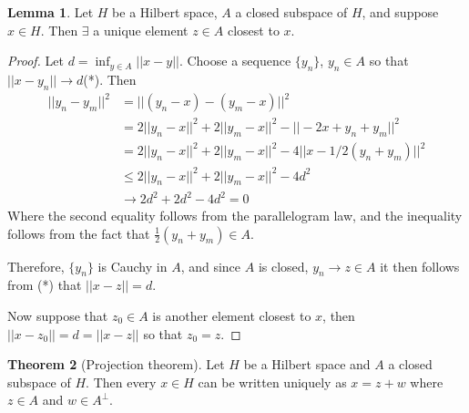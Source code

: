 \documentclass[11pt,a4paper]{article}
\theoremstyle{definition}
\newtheorem{thm}{Theorem}[section]
\newtheorem{lem}[thm]{Lemma}
\begin{document}
\begin{lem}
Let $H$ be a Hilbert space, $A$ a closed subspace of $H$, and suppose $x\in H$. Then $\exists$ a unique element $z\in A$ closest to $x$.

\end{lem}

\begin{proof}
Let $d=\inf_{y\in A}||x-y||$. Choose a sequence $\{y_n\}$, $y_n\in A$ so that $||x-y_n||\rightarrow d$\qquad (*). Then
\begin{align*}
||y_n-y_m||^2 &=||(y_n-x)-(y_m-x)||^2\\
              &=2||y_n-x||^2+2||y_m-x||^2-||-2x+y_n+y_m||^2\\
              &=2||y_n-x||^2+2||y_m-x||^2-4||x-1/2(y_n+y_m)||^2\\
              &\leq 2||y_n-x||^2+2||y_m-x||^2-4d^2\\
              &\rightarrow 2d^2+2d^2-4d^2=0
\end{align*}
Where the second equality follows from the parallelogram law, and the inequality follows from the fact that $\frac{1}{2}(y_n+y_m)\in A$.

Therefore, $\{y_n\}$ is Cauchy in $A$, and since $A$ is closed, $y_n\rightarrow z\in A$ it then follows from (*) that $||x-z||=d$.

Now suppose that $z_0\in A$ is another element closest to $x$, then\hspace{0.2cm} $||x-z_0||=d=||x-z||$ so that $z_0=z$.

\end{proof}


\begin{thm}[Projection theorem]
Let $H$ be a Hilbert space and $A$ a closed subspace of $H$. Then every $x\in H$ can be written uniquely as \hspace{0.2cm}$x=z+w$\hspace{0.2cm} where $z\in A$ and $w\in A^{\perp}$.

\end{thm}
\end{document}
